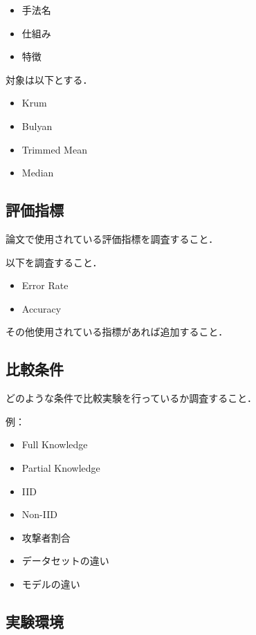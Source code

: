 \documentclass[a4j, twocolumn]{jsarticle}  %
\begin{document}
\begin{itemize}
    \item 手法名
    \item 仕組み
    \item 特徴
\end{itemize}

対象は以下とする．

\begin{itemize}
    \item Krum
    \item Bulyan
    \item Trimmed Mean
    \item Median
\end{itemize}

\subsection{評価指標}

論文で使用されている評価指標を調査すること．

以下を調査すること．

\begin{itemize}
    \item Error Rate
    \item Accuracy
\end{itemize}

その他使用されている指標があれば追加すること．

\subsection{比較条件}

どのような条件で比較実験を行っているか調査すること．

例：

\begin{itemize}
    \item Full Knowledge
    \item Partial Knowledge
    \item IID
    \item Non-IID
    \item 攻撃者割合
    \item データセットの違い
    \item モデルの違い
\end{itemize}

\subsection{実験環境}
\end{document}
